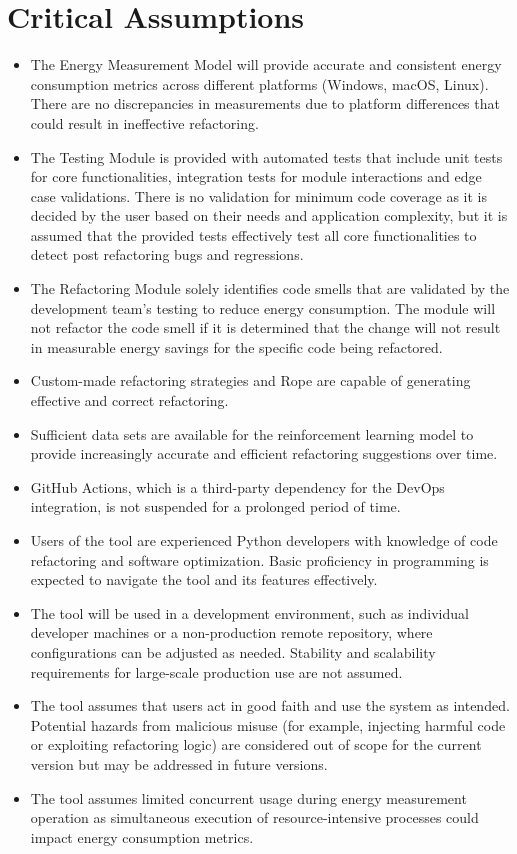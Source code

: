\documentclass{article}
\newcounter{hazard}
\begin{document}
\section{Critical Assumptions}

\begin{itemize}
    \item The Energy Measurement Model will provide accurate and consistent energy consumption metrics across different platforms (Windows, macOS, Linux). There are no discrepancies in measurements due to platform differences that could result in ineffective refactoring.
    \item The Testing Module is provided with automated tests that include unit tests for core functionalities, integration tests for module interactions and edge case validations. There is no validation for minimum code coverage as it is decided by the user based on their needs and application complexity, but it is assumed that the provided tests effectively test all core functionalities to detect post refactoring bugs and regressions.
    \item The Refactoring Module solely identifies code smells that are validated by the development team's testing to reduce energy consumption. The module will not refactor the code smell if it is determined that the change will not result in measurable energy savings for the specific code being refactored.
    \item Custom-made refactoring strategies and Rope are capable of generating effective and correct refactoring.
    \item Sufficient data sets are available for the reinforcement learning model to provide increasingly accurate and efficient refactoring suggestions over time.
    \item GitHub Actions, which is a third-party dependency for the DevOps integration, is not suspended for a prolonged period of time.
    \item Users of the tool are experienced Python developers with knowledge of code refactoring and software optimization. Basic proficiency in programming is expected to navigate the tool and its features effectively.
    \item The tool will be used in a development environment, such as individual developer machines or a non-production remote repository, where configurations can be adjusted as needed. Stability and scalability requirements for large-scale production use are not assumed.
    \item The tool assumes that users act in good faith and use the system as intended. Potential hazards from malicious misuse (for example, injecting harmful code or exploiting refactoring logic) are considered out of scope for the current version but may be addressed in future versions.
    \item The tool assumes limited concurrent usage during energy measurement operation as simultaneous execution of resource-intensive processes could impact energy consumption metrics.
\end{itemize}
\end{document}
